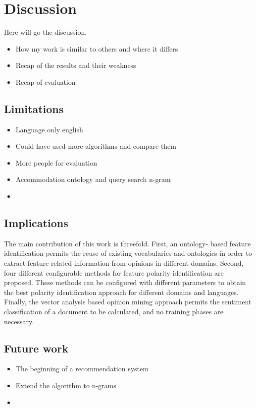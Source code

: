%
%
\let\textcircled=\pgftextcircled
\chapter{Discussion}
\label{chap:dis}
Here will go the discussion.
\begin{itemize}
\item  How my work is similar to others and where it differs
\item Recap of the results and their weakness
\item Recap of evaluation
\end{itemize}

\section{Limitations}

\begin{itemize}
\item Language only english
\item  Could have used more algorithms and compare them
\item More people for evaluation
\item Accommodation ontology and query search n-gram
\item 
\end{itemize}




\section{Implications}

The main contribution of this work is threefold. First, an ontology-
based feature identification permits the reuse of existing
vocabularies and ontologies in order to extract feature related
information from opinions in different domains. Second, four different
configurable methods for feature polarity identification are
proposed. These methods can be configured with different parameters
to obtain the best polarity identification approach for different
domains and languages. Finally, the vector analysis based
opinion mining approach permits the sentiment classification of
a document to be calculated, and no training phases are necessary.
\section{Future work}
\begin{itemize}
\item  The beginning of a recommendation system
\item Extend the algorithm to n-grams
\item 
\end{itemize}
